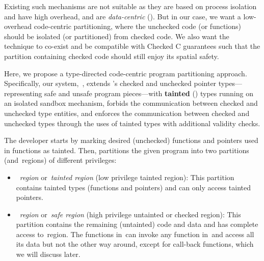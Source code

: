 Existing such mechanisms are not suitable as they are based on process isolation and have high overhead, and are \emph{data-centric} ().
But in our case, we want a low-overhead code-centric partitioning, where the unchecked code (or functions) should be isolated (or partitioned) from checked code. We also want the technique to co-exist and be compatible with Checked C guarantees such that the partition containing checked code should still enjoy its spatial safety.

Here, we propose a type-directed code-centric program partitioning approach.
Specifically, our system,~\systemname, extends \checkedc's checked and unchecked pointer types---representing safe and unsafe program pieces---with \textbf{tainted} (\taintt) types running on an isolated sandbox mechanism,
forbids the communication between checked and unchecked type entities, and enforces the communication between checked and unchecked types
through the uses of tainted types with additional validity checks. 
% 
% 

The developer starts by marking desired (\ie unchecked) functions and pointers used in functions as tainted. 
Then, \systemname partitions the given program into two partitions (\umode and~\cmode regions)  of different privileges:

\begin{itemize}
\item~\umode \emph{region} or~\emph{tainted region} (low privilege tainted region): This partition contains tainted types (\ie functions and pointers) and can only access tainted pointers.
\item~\cmode \emph{region} or~\emph{safe region} (high privilege untainted or checked region): This partition contains the remaining (untainted) code and data and has complete access to~\cmode region.
The functions in~\cregion can invoke any function in~\ucregion and access all its data but not the other way around, except for call-back functions, which we will discuss later.
\end{itemize}

